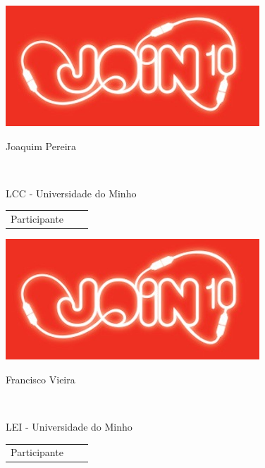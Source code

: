 \documentclass[twocolumn]{article}
\newcommand\BackgroundPic[1]{ 
 \put(-4,0){\parbox[b][\paperheight]{\paperwidth}{%
 \vfill 
 \centering 
 \texttt{[image: \#1]}%
 \vfill 
 }}}
\begin{document}
 
 \AddToShipoutPicture{\BackgroundPic{design/10pag}} 
 \begin{minipage}{89mm} 
 \includegraphics{design/logo}\\ 
 
 \addvspace{5mm} 
 
 \begin{center} 
 \huge{Joaquim Pereira} 
 \scriptsize{ 
 \begin{tabular*}{0.75\textwidth}{c} 
 \hline 
 \end{tabular*}}\\ 
LCC - Universidade do Minho
 \end{center} 
 
 \begin{flushright} 
 \begin{tabular}{r l l} 
 \normalsize{Participante} & & 
 \end{tabular} 
 \end{flushright} 
 \end{minipage} 
 
  
 \vspace{12mm} 
 
 \begin{minipage}{89mm} 
 \includegraphics{design/logo}\\ 
 
 \addvspace{5mm} 
 
 \begin{center} 
 \huge{Francisco Vieira} 
 \scriptsize{ 
 \begin{tabular*}{0.75\textwidth}{c} 
 \hline 
 \end{tabular*}}\\ 
LEI - Universidade do Minho
 \end{center} 
 
 \begin{flushright} 
 \begin{tabular}{r l l} 
 \normalsize{Participante} & & 
 \end{tabular} 
 \end{flushright} 
 \end{minipage} 
 
\end{document}
